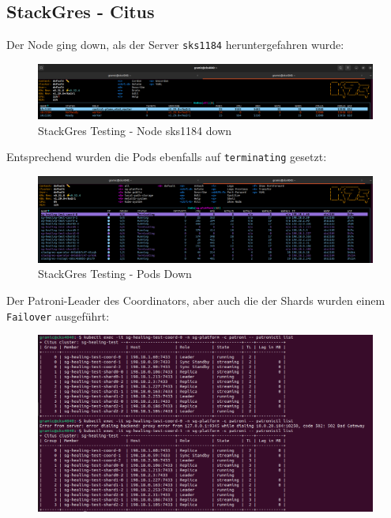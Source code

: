 
\begin{flushleft}
    \subsection{StackGres - Citus}
    \label{subsec:appendix_testing_stackgres_citus}
    Der Node ging down, als der Server \texttt{sks1184} heruntergefahren wurde:
    \begin{figure}[H]
        \centering
        \includegraphics[width=1\linewidth]{source/appendix/evaluation_testing/stackgres_node_sks1184_down}
        \caption{StackGres Testing - Node sks1184 down}
        \label{fig:stackgres_node_sks1184_down}
    \end{figure}
    Entsprechend wurden die Pods ebenfalls auf \texttt{terminating} gesetzt:
    \begin{figure}[H]
        \centering
        \includegraphics[width=1\linewidth]{source/appendix/evaluation_testing/stackgres_citus_testing_node_down}
        \caption{StackGres Testing - Pods Down}
        \label{fig:stackgres_citus_testing_node_down}
    \end{figure}
    Der Patroni-Leader des Coordinators, aber auch die der Shards wurden einem \texttt{Failover} ausgeführt:
    \begin{figure}[H]
        \centering
        \includegraphics[width=1\linewidth]{source/appendix/evaluation_testing/stackgres_patroni_failover_overview}

\end{figure}
\end{flushleft}
